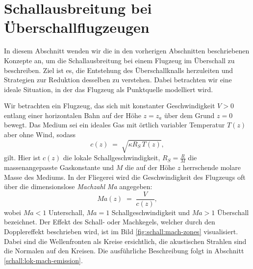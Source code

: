 %
%
%
%
\section{Schallausbreitung bei Überschallflugzeugen
\label{schall:section:teil3}}

In diesem Abschnitt wenden wir die in den vorherigen Abschnitten
beschriebenen Konzepte an, um die Schallausbreitung bei einem
Flugzeug im Überschall zu beschreiben.
Ziel ist es, die Entstehung des Überschallknalls herzuleiten und Strategien
zur Reduktion desselben zu verstehen.
Dabei betrachten wir eine ideale Situation, in der das Flugzeug als
Punktquelle modelliert wird.

Wir betrachten ein Flugzeug, das sich mit konstanter Geschwindigkeit
$V>0$ entlang einer horizontalen Bahn auf der Höhe $z=z_a$ über
dem Grund $z=0$ bewegt.
Das Medium sei ein ideales Gas mit örtlich variabler Temperatur
$T(z)$ aber ohne Wind, sodass
\begin{equation}
    c(z) \;=\; \sqrt{\kappa R_S\,T(z)} ,
    \label{eq:c-of-z}
\end{equation}
gilt. Hier ist $c(z)$ die lokale Schallgeschwindigkeit, $R_S = \frac{R}{M}$
die massenangepasste Gaskonstante und $M$ die auf der Höhe $z$ herrschende
molare Masse des Mediums.
In der Fliegerei wird die Geschwindigkeit des Flugzeugs oft über die
dimensionslose \emph{Machzahl} \textit{Ma} angegeben:
\begin{equation}
    \textit{Ma}(z) \;=\; \frac{V}{c(z)},
    \label{eq:mach-number}
\end{equation}
wobei $\textit{Ma}<1$ Unterschall, $\textit{Ma}=1$ Schallgeschwindigkeit
und $\textit{Ma}>1$ Überschall bezeichnet.
Der Effekt des Schall- oder Machkegels, welcher durch den Dopplereffekt
beschrieben wird, ist im Bild \ref{fig:schall:mach-zones} visualisiert.
Dabei sind die Wellenfronten als Kreise ersichtlich, die akustischen
Strahlen sind die Normalen auf den Kreisen. Die ausführliche Beschreibung
folgt in Abschnitt \ref{schall:lok-mach-emission}.

